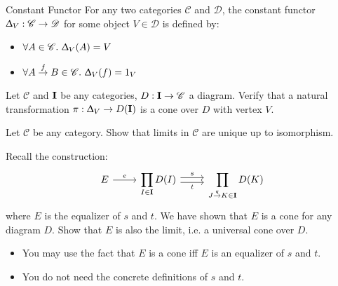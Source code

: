 \begin{definition}
  {Constant Functor}
  For any two categories $\mathscr{C}$ and $\mathscr{D}$,
  the constant functor $\Updelta _ V : \mathscr{C} \to \mathscr{D} $ for some object $V \in \mathscr{D}$
  is defined by:
  \begin{itemize}
    \item $\forall A \in \mathscr{C}. \ \Updelta _ V (A) = V$
    \item $\forall A \overset{f}{\to} B \in \mathscr{C}. \ \Updelta _ V (f) = 1_V$
  \end{itemize}
  
\end{definition}

\begin{exercise}
  Let $\mathscr{C}$ and $\bf{I}$ be any categories, $D : \bf{I} \to \mathscr{C}$ a diagram.
  Verify that a natural transformation $\pi : \Updelta_V \to D(\bf{I})$ is a cone over $D$ with vertex $V$.
\end{exercise}

\begin{exercise}
  Let $\mathscr{C}$ be any category. Show that limits in $\mathscr{C}$ are unique up to isomorphism.
\end{exercise}

\newpage

\begin{exercise}
  Recall the construction:
  \[
    \begin{tikzcd}
      E \arrow{r}{e} &
      \displaystyle \prod_{I \in \bf{I}} D(I) \arrow[r,shift left, "s"] \arrow[r,shift right,swap,"t"] &
      \displaystyle \prod_{J \overset{q}{\to} K \in \bf{I}} D(K)
    \end{tikzcd}
  \]
  where $E$ is the equalizer of $s$ and $t$.
  We have shown that $E$ is a cone for any diagram $D$. Show that $E$ is also the limit,
  i.e. a universal cone over $D$.
\end{exercise}
\begin{hint}
  \begin{itemize}
  \item You may use the fact that $E$ is a cone iff $E$ is an equalizer of $s$ and $t$.
  \item You do not need the concrete definitions of $s$ and $t$.
  \end{itemize}
\end{hint}



